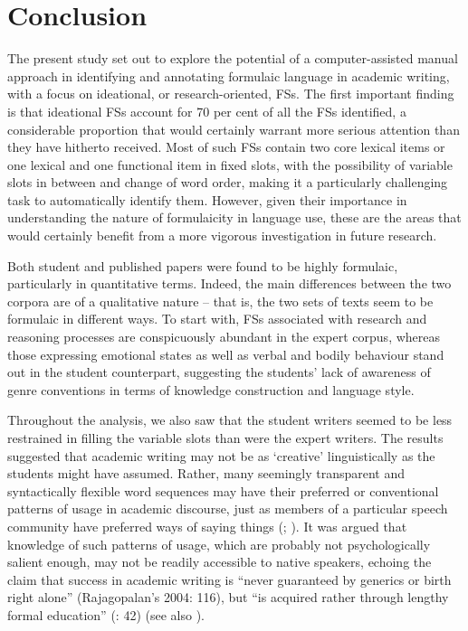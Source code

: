 \documentclass[output=paper]{langsci/langscibook}
\begin{document}
\section{Conclusion}

The present study set out to explore the potential of a computer-assisted manual approach in identifying and annotating formulaic language in academic writing, with a focus on ideational, or research-oriented, FSs. The first important finding is that ideational FSs account for 70 per cent of all the FSs identified, a considerable proportion that would certainly warrant more serious attention than they have hitherto received. Most of such FSs contain two core lexical items or one lexical and one functional item in fixed slots, with the possibility of variable slots in between and change of word order, making it a particularly challenging task to automatically identify them. However, given their importance in understanding the nature of formulaicity in language use, these are the areas that would certainly benefit from a more vigorous investigation in future research.

Both student and published papers were found to be highly formulaic, particularly in quantitative terms. Indeed, the main differences between the two corpora are of a qualitative nature – that is, the two sets of texts seem to be formulaic in different ways. To start with, FSs associated with research and reasoning processes are conspicuously abundant in the expert corpus, whereas those expressing emotional states as well as verbal and bodily behaviour stand out in the student counterpart, suggesting the students’ lack of awareness of genre conventions in terms of knowledge construction and language style.

Throughout the analysis, we also saw that the student writers seemed to be less restrained in filling the variable slots than were the expert writers. The results suggested that academic writing may not be as ‘creative’ linguistically as the students might have assumed. Rather, many seemingly transparent and syntactically flexible word sequences may have their preferred or conventional patterns of usage in academic discourse, just as members of a particular speech community have preferred ways of saying things (\citealt{Wray2002}; \citealt{Kecskes2016}). It was argued that knowledge of such patterns of usage, which are probably not psychologically salient enough, may not be readily accessible to native speakers, echoing the claim that success in academic writing is “never guaranteed by generics or birth right alone” (Rajagopalan’s 2004: 116), but “is acquired rather through lengthy formal education” (\citealt{FergusonEtAl2011}: 42) (see also \citealt{Hyland2016}). 
\end{document}
